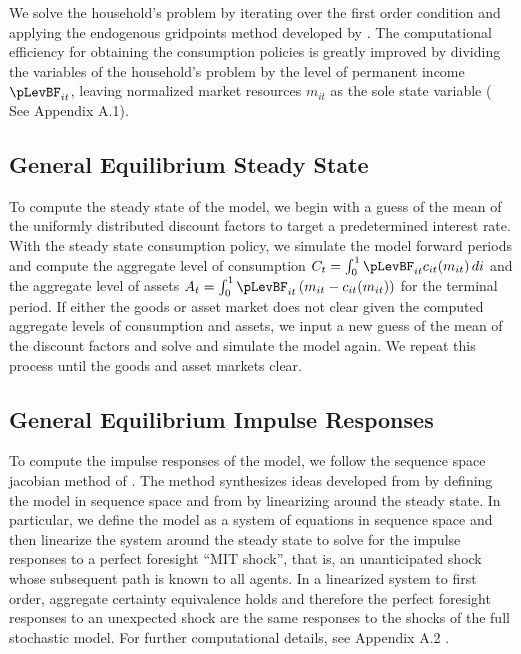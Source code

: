 \documentclass[titlepage]{\econtex}\providecommand{\texname}{BufferStockTheory}
\begin{document}
We solve the household's problem by iterating over the first order condition and applying the endogenous gridpoints method developed by \cite{carroll2006method}. The computational efficiency for obtaining the consumption policies is greatly improved by dividing the variables of the household's problem by the level of permanent income $\pLevBF_{it}$, leaving normalized market resources $m_{it}$ as the sole state variable ( See Appendix  A.1).  

\hypertarget{General Equilibrium Steady State}{}
\subsection{General Equilibrium Steady State}

To compute the steady state of the model, we begin with a guess of the mean of the uniformly distributed discount factors to target a predetermined interest rate.  With the steady state consumption policy, we simulate the model forward periods and compute the aggregate level of consumption $ C_{t} =  \int_{0}^{1} \pLevBF_{it} c_{it}(m_{it})\, di$  and the aggregate level of assets $ A_{t} = \int_{0}^{1} \pLevBF_{it} \left( m_{it} -  c_{it}(m_{it}) \right)$ for the terminal period. If either the goods or asset market does not clear given the computed aggregate levels of consumption and assets,  we input a new guess of the mean of the discount factors and solve and simulate the model again. We repeat this process until the goods and asset markets clear.  


\hypertarget{General Equilibrium Impulse Responses}{}
\subsection{General Equilibrium Impulse Responses}

To compute the impulse responses of the model, we follow the sequence space jacobian method of \cite{auclert2019using} . The method synthesizes ideas developed from  \cite {boppart2018exploiting} by defining the model in sequence space and from \cite{reiter2009solving} by linearizing around the steady state. In particular, we define the model as a system of equations in sequence space and then linearize the system around the steady state to solve for the impulse responses to a perfect foresight ``MIT shock'', that is, an unanticipated shock whose subsequent path is known to all agents.  In a linearized system to first order, aggregate certainty equivalence holds  \cite{ simon1956dynamic}  \cite{theil1957note}  and therefore the perfect foresight responses to an unexpected shock are the same responses to the shocks of the full stochastic model. For further computational details, see Appendix A.2 . \\ 
\end{document}
